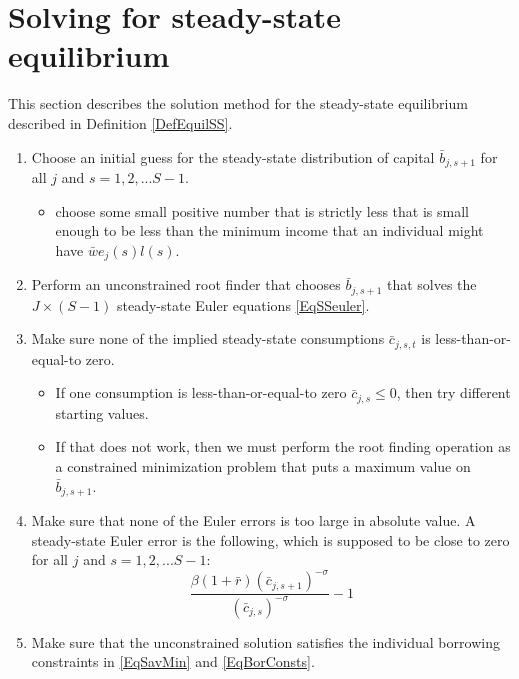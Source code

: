 \documentclass[letterpaper,12pt]{article}
\theoremstyle{definition}
\renewcommand\theenumi{\roman{enumi}}
\begin{document}
\newpage
\section{Solving for steady-state equilibrium}\label{AppSSsolve}

  \setcounter{equation}{0}
  \renewcommand\theenumi{\arabic{enumi}}
  \renewcommand\theenumii{\alph{enumii}}
  \renewcommand\theenumiii{\roman{enumiii}}

  This section describes the solution method for the steady-state equilibrium described in Definition \ref{DefEquilSS}.

  \begin{enumerate}
    \item Choose an initial guess for the steady-state distribution of capital $\bar{b}_{j,s+1}$ for all $j$ and $s=1,2,...S-1$.
      \begin{itemize}
        \item choose some small positive number that is strictly less that is small enough to be less than the minimum income that an individual might have $\bar{w}e_j(s)l(s)$.
      \end{itemize}
    \item Perform an unconstrained root finder that chooses $\bar{b}_{j,s+1}$ that solves the $J\times(S-1)$ steady-state Euler equations \eqref{EqSSeuler}.
    \item Make sure none of the implied steady-state consumptions $\bar{c}_{j,s,t}$ is less-than-or-equal-to zero.
      \begin{itemize}
        \item If one consumption is less-than-or-equal-to zero $\bar{c}_{j,s}\leq 0$, then try different starting values.
        \item If that does not work, then we must perform the root finding operation as a constrained minimization problem that puts a maximum value on $\bar{b}_{j,s+1}$.
      \end{itemize}
    \item Make sure that none of the Euler errors is too large in absolute value. A steady-state Euler error is the following, which is supposed to be close to zero for all $j$ and $s=1,2,...S-1$:
      \begin{equation}\label{EqSSeulerr}
        \frac{\beta \left(1+\bar{r}\right)\left(\bar{c}_{j,s+1}\right)^{-\sigma}}{\left(\bar{c}_{j,s}\right)^{-\sigma}} - 1
      \end{equation}
    \item Make sure that the unconstrained solution satisfies the individual borrowing constraints in \eqref{EqSavMin} and \eqref{EqBorConsts}.

\end{enumerate}
\end{document}

